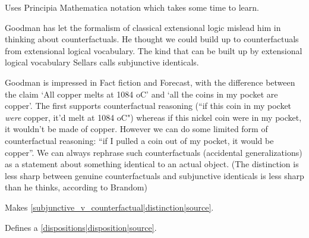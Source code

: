 Uses Principia Mathematica notation which takes some time to learn.

Goodman has let the formalism of classical extensional logic mislead him in thinking about counterfactuals. He thought we could build up to counterfactuals from extensional logical vocabulary. The kind that can be built up by extensional logical vocabulary Sellars calls subjunctive identicals.

Goodman is impressed in Fact fiction and Forecast, with the difference between the claim `All copper melts at 1084 oC' and `all the coins in my pocket are copper'. The first supports counterfactual reasoning (``if this coin in my pocket \emph{were} copper, it'd melt at 1084 oC") whereas if this nickel coin were in my pocket, it wouldn't be made of copper. However we can do some limited form of counterfactual reasoning: ``if I pulled a coin out of my pocket, it would be copper''. We can always rephrase such counterfactuals (accidental generalizations) as a statement about something identical to an actual object. (The distinction is less sharp between genuine counterfactuals and subjunctive identicals is less sharp than he thinks, according to Brandom)

Makes \ref{subjunctive_v_counterfactual|distinction|source}.

Defines a \ref{dispositions|disposition|source}.